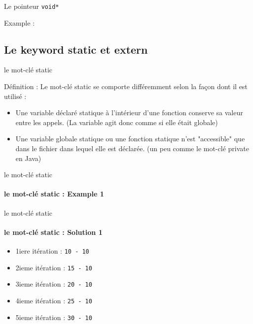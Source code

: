   	\begin{frame}{Le pointeur \texttt{void*}}
  		\begin{exampleblock}{Example : }
  			\voidPtrExmpl
  		\end{exampleblock}
  	\end{frame}
  	

    \subsection{Le keyword static et extern}
    \begin{frame}{le mot-clé static}
    	\begin{block}{Définition :}
    		Le mot-clé static se comporte différemment selon la façon dont il est utilisé :
    		\begin{itemize}
    			\item Une variable déclaré statique à l'intérieur d'une fonction conserve sa valeur entre les appels. (La variable agit donc comme si elle était globale)
    			\item Une variable globale statique ou une fonction statique n'est "accessible" que dans le fichier dans lequel elle est déclarée. (un peu comme le mot-clé \alert{private} en Java)
    		\end{itemize}
    	\end{block}
    \end{frame}

	\begin{frame}{le mot-clé static}
		\framesubtitle{le mot-clé static : Example 1}
		\staticInFuncExmp
	\end{frame}

	\begin{frame}{le mot-clé static}
		\framesubtitle{le mot-clé static : Solution 1}
		\begin{itemize}
			\item 1iere itération : \texttt{10 - 10}
			\item 2ieme itération : \texttt{15 - 10}
			\item 3ieme itération : \texttt{20 - 10}
			\item 4ieme itération : \texttt{25 - 10}
			\item 5ieme itération : \texttt{30 - 10}
		\end{itemize}
	\end{frame}

